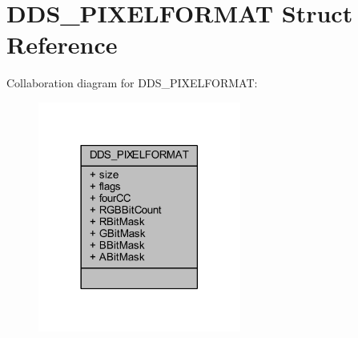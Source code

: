 \hypertarget{struct_d_d_s___p_i_x_e_l_f_o_r_m_a_t}{}\section{D\+D\+S\+\_\+\+P\+I\+X\+E\+L\+F\+O\+R\+M\+AT Struct Reference}
\label{struct_d_d_s___p_i_x_e_l_f_o_r_m_a_t}


Collaboration diagram for D\+D\+S\+\_\+\+P\+I\+X\+E\+L\+F\+O\+R\+M\+AT\+:\nopagebreak
\begin{figure}[H]
\begin{center}
\leavevmode
\includegraphics[width=189pt]{struct_d_d_s___p_i_x_e_l_f_o_r_m_a_t__coll__graph}
\end{center}
\end{figure}
